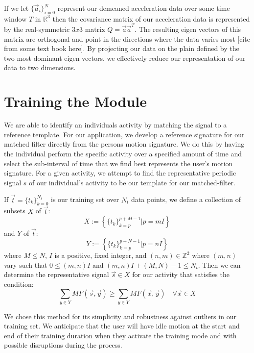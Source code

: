 \documentclass[journal]{IEEEtran}
\begin{document}
If we let $\{\vec{a}_i\}_{i=0}^{N}$ represent our demeaned acceleration data over some time window $T$ in $\mathbb{R}^3$ then the covariance matrix of our acceleration data is represented by the real-symmetric $3x3$ matrix $Q = \vec{a} \vec{a}^T$.
The resulting eigen vectors of this matrix are orthogonal and point in the directions where the data varies most [cite from some text book here].
By projecting our data on the plain defined by the two most dominant eigen vectors, we effectively reduce our representation of our data to two dimensions.
%
\section{Training the Module}
We are able to identify an individual\textquotesingle s activity by matching the signal to a reference template.
For our application, we develop a reference signature for our matched filter directly from the person\textquotesingle s motion signature.
We do this by having the individual perform the specific activity over a specified amount of time and select the sub-interval of time that we find best represents the user's motion signature.
For a given activity, we attempt to find the representative periodic signal $s$ of our individual’s activity to be our template for our matched-filter.

If $\vec{t} = \{t_k\}_{k=0}^{N_t}$ is our training set over $N_t$ data points, we define a collection of subsets $X$ of $\vec{t}$:
%
\begin{equation} \label{X_subsets_of_training_eq}
X := \left \{ \{t_k\}_{k=p}^{p+M-1} | p=mI \right \}
\end{equation}
%
and $Y$ of $\vec{t}$:
%
\begin{equation} \label{Y_subsets_of_training_eq}
Y := \left \{ \{t_k\}_{k=p}^{p+N-1} | p=nI \right \}
\end{equation}
%
where $M \leq N$, $I$ is a positive, fixed integer, and $(n,m) \in \mathbb{Z}^2$ where $(m,n)$ vary such that $0 \leq (m,n)I$ and $(m,n)I + (M,N) - 1 \leq N_t$. Then we can determine the representative signal $\vec{s} \in X$ for our activity that satisfies the condition:
%
\begin{equation} \label{s_condition}
\sum_{y \in Y}MF(\vec{s}, \vec{y}) \geq \sum_{y \in Y}MF(\vec{x},\vec{y}) \quad \forall \vec{x} \in X
\end{equation}

We chose this method for its simplicity and robustness against outliers in our training set. We anticipate that the user will have idle motion at the start and end of their training duration when they activate the training mode and with possible disruptions during the process.
%
\end{document}
